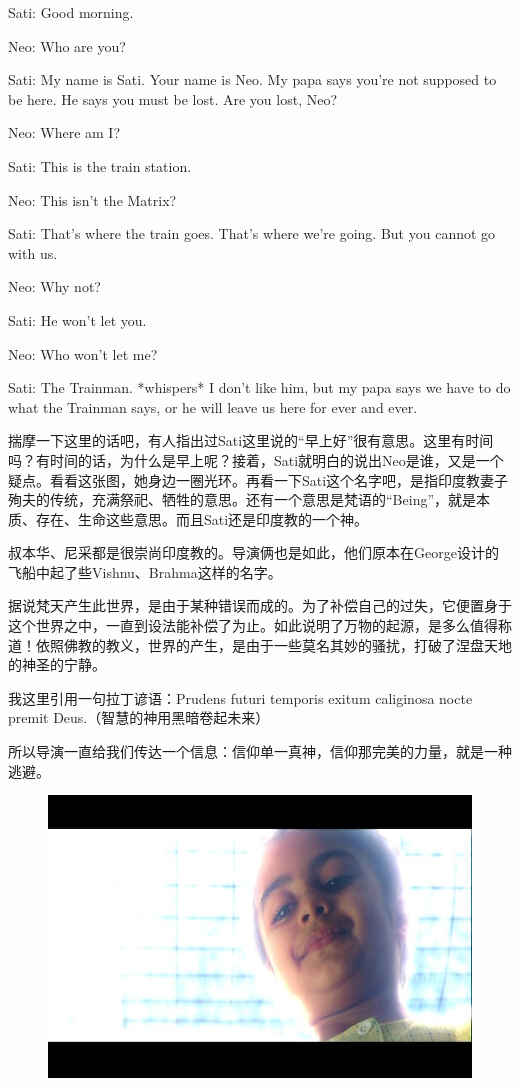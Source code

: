 \documentclass[UTF8]{ctexart}
\newenvironment{myquote}{\color{green} \setlength{\leftskip}{6em} \setlength{\rightskip}{4em} \setlength{\parindent}{-2em}}{\par}
\begin{document}
\begin{myquote}
Sati: Good morning.

Neo: Who are you?

Sati: My name is Sati. Your name is Neo. My papa says you're not supposed to be here. He says you must be lost. Are you lost, Neo?

Neo: Where am I?

Sati: This is the train station.

Neo: This isn't the Matrix?

Sati: That's where the train goes. That's where we're going. But you cannot go with us.

Neo: Why not?

Sati: He won't let you.

Neo: Who won't let me?

Sati: The Trainman. *whispers* I don't like him, but my papa says we have to do what the Trainman says, or he will leave us here for ever and ever.
\end{myquote}

揣摩一下这里的话吧，有人指出过Sati这里说的“早上好”很有意思。这里有时间吗？有时间的话，为什么是早上呢？接着，Sati就明白的说出Neo是谁，又是一个疑点。看看这张图，她身边一圈光环。再看一下Sati这个名字吧，是指印度教妻子殉夫的传统，充满祭祀、牺牲的意思。还有一个意思是梵语的“Being”，就是本质、存在、生命这些意思。而且Sati还是印度教的一个神。

叔本华、尼采都是很崇尚印度教的。导演俩也是如此，他们原本在George设计的飞船中起了些Vishnu、Brahma这样的名字。

据说梵天产生此世界，是由于某种错误而成的。为了补偿自己的过失，它便置身于这个世界之中，一直到设法能补偿了为止。如此说明了万物的起源，是多么值得称道！依照佛教的教义，世界的产生，是由于一些莫名其妙的骚扰，打破了涅盘天地的神圣的宁静。

我这里引用一句拉丁谚语：Prudens futuri temporis exitum caliginosa nocte premit Deus.（智慧的神用黑暗卷起未来）

所以导演一直给我们传达一个信息：信仰单一真神，信仰那完美的力量，就是一种逃避。

\begin{figure}[htb]
\centering
\includegraphics[width=0.5\linewidth]{fig/cce0b3b70bb105f431add112.jpg}
\end{figure}
\end{document}
